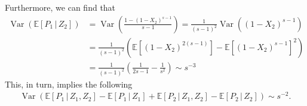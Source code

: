 \documentclass[letterpaper,10pt]{article}
\numberwithin{equation}{section}
\numberwithin{thm}{section}
\numberwithin{lem}{section}
\numberwithin{cor}{section}
\newcommand{\E}{\mathbb{E}}
\newcommand{\1}{\mathbb{1}}
\begin{document}
Furthermore, we can find that
\begin{equation*}
	\begin{aligned}
		\operatorname{Var}\left(\mathbb{E}[P_1 \, | \, Z_2]\right)
		 & = \operatorname{Var}\left(\frac{1 - (1-X_2)^{s-1}}{s-1}\right)
		= \frac{1}{(s-1)^2} \operatorname{Var}\left((1-X_2)^{s-1}\right)                                                    \\
		 & = \frac{1}{(s-1)^2}\left(\mathbb{E}\left[(1-X_2)^{2(s-1)}\right] - \mathbb{E}\left[(1-X_2)^{s-1}\right]^2\right) \\
		 & = \frac{1}{(s-1)^2}\left(\frac{1}{2s - 1} - \frac{1}{s^2}\right)
		\sim s^{-3}
	\end{aligned}
\end{equation*}
This, in turn, implies the following
\begin{equation*}
	\begin{aligned}
		\operatorname{Var}\left(\E[P_1 \, | \, Z_1, Z_2] - \E[P_1 \, | \, Z_1] + \E[P_2 \, | \, Z_1, Z_2] - \E[P_2 \, | \, Z_2]\right)
		\sim s^{-2}.
	\end{aligned}
\end{equation*}
\end{document}
